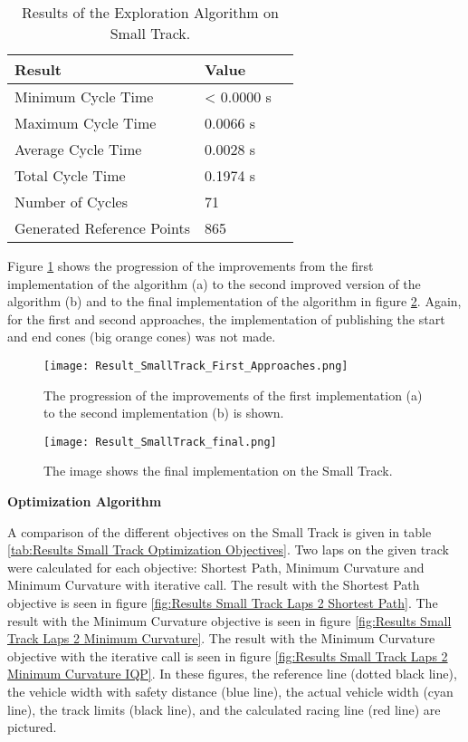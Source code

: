 \begin{table}[H]
    \centering
    \begin{tabular}{|l|l|l|}
        \hline
        \textbf{Result}            & \textbf{Value} \\ \hline
        Minimum Cycle Time         & < 0.0000 s     \\ \hline
        Maximum Cycle Time         & 0.0066 s       \\ \hline
        Average Cycle  Time        & 0.0028 s       \\ \hline
        Total Cycle Time           & 0.1974 s       \\ \hline
        Number of Cycles           & 71             \\ \hline
        Generated Reference Points & 865            \\ \hline
    \end{tabular}
    \caption{Results of the Exploration Algorithm on Small Track.}
    \label{tab:Results Small Track Exploration}
\end{table}

Figure \ref{fig:Result Small Track First Approaches} shows the progression of the improvements from the first implementation of the algorithm (a) to the second improved version of the algorithm (b) and to the final implementation of the algorithm in figure \ref{fig:Result Small Track Final}. Again, for the first and second approaches, the implementation of publishing the start and end cones (big orange cones) was not made. 
\begin{figure}[H]
    \centering
    \texttt{[image: Result\_SmallTrack\_First\_Approaches.png]}
    \caption{The progression of the improvements of the first implementation (a) to the second implementation (b) is shown.}
    \label{fig:Result Small Track First Approaches}
\end{figure}
\begin{figure}[H]
    \centering
    \texttt{[image: Result\_SmallTrack\_final.png]}
    \caption{The image shows the final implementation on the Small Track.}
    \label{fig:Result Small Track Final}
\end{figure}

\textbf{Optimization Algorithm}

A comparison of the different objectives on the Small Track is given in table \ref{tab:Results Small Track Optimization Objectives}. Two laps on the given track were calculated for each objective: Shortest Path, Minimum Curvature and Minimum Curvature with iterative call. The result with the Shortest Path objective is seen in figure \ref{fig:Results Small Track Laps 2 Shortest Path}. The result with the Minimum Curvature objective is seen in figure \ref{fig:Results Small Track Laps 2 Minimum Curvature}. The result with the Minimum Curvature objective with the iterative call is seen in figure \ref{fig:Results Small Track Laps 2 Minimum Curvature IQP}. In these figures, the reference line (dotted black line), the vehicle width with safety distance (blue line), the actual vehicle width (cyan line), the track limits (black line), and the calculated racing line (red line) are pictured.

